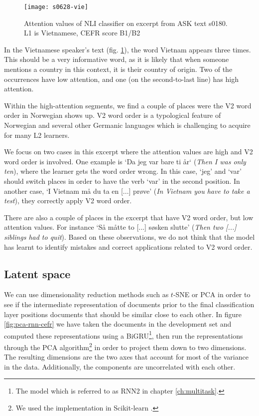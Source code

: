 \begin{figure}
  \centering
  \texttt{[image: s0628-vie]}
  \caption[Attention heat map in a text by a Vietnamese speaker]{
    Attention values of NLI classifier on excerpt from ASK text s0180. L1 is
    Vietnamese, CEFR score B1/B2
  }
  \label{fig:vie-attention}
\end{figure}

In the Vietnamese speaker's text (fig. \ref{fig:vie-attention}), the word
Vietnam appears three times. This should be a very informative word, as it is
likely that when someone mentions a country in this context, it is their
country of origin. Two of the occurrences have low attention, and one (on the
second-to-last line) has high attention.

Within the high-attention segments, we find a couple of places were the V2
word order in Norwegian shows up. V2 word order is a typological feature of
Norwegian and several other Germanic languages which is challenging to
acquire for many L2 learners.

We focus on two cases in this excerpt where the attention values are high and
V2 word order is involved. One example is `Da jeg var bare ti år` (\emph{Then
I was only ten}), where the learner gets the word order wrong. In this case,
`jeg' and `var' should switch places in order to have the verb `var' in the
second position. In another case, `I Vietnam må du ta en [...] prøve'
(\emph{In Vietnam you have to take a test}), they correctly apply V2 word
order.

There are also a couple of places in the excerpt that have V2 word order, but
low attention values. For instance `Så måtte to [...] søsken slutte'
(\emph{Then two [...] siblings had to quit}). Based on these observations, we
do not think that the model has learnt to identify mistakes and correct
applications related to V2 word order.


\subsection{Latent space}

We can use dimensionality reduction methods such as $t$-SNE or \ac{PCA} in
order to see if the intermediate representation of documents prior to the
final classification layer positions documents that should be similar close
to each other. In figure \ref{fig:pca-rnn-cefr} we have taken the documents
in the development set and computed these representations using a
BiGRU\footnote{The model which is referred to as RNN2 in chapter
\ref{ch:multitask}.}, then run the representations through the PCA
algorithm\footnote{We used the implementation in Scikit-learn
\autocite{scikit-learn}.} in order to project them down to two dimensions.
The resulting dimensions are the two axes that account for most of the
variance in the data. Additionally, the components are uncorrelated with each
other.

